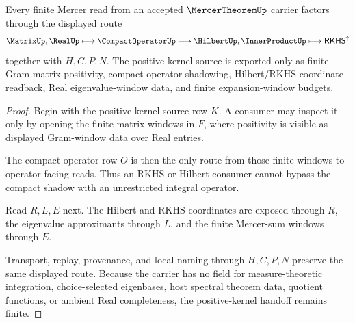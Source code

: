 \begin{theorem}
\label{thm:mercer-theorem-positive-kernel-handoff}
Every finite Mercer read from an accepted $\MercerTheoremUp$ carrier factors through the displayed route
$$
\MatrixUp,\RealUp \longmapsto \CompactOperatorUp \longmapsto \HilbertUp,\InnerProductUp \longmapsto \mathsf{RKHS}^{\uparrow}
$$
together with $H,C,P,N$. The positive-kernel source is exported only as finite Gram-matrix positivity, compact-operator shadowing, Hilbert/RKHS coordinate readback, Real eigenvalue-window data, and finite expansion-window budgets.
\end{theorem}
\begin{proof}
Begin with the positive-kernel source row $K$. A consumer may inspect it only by opening the finite matrix windows in $F$, where positivity is visible as displayed Gram-window data over Real entries.

The compact-operator row $O$ is then the only route from those finite windows to operator-facing reads. Thus an RKHS or Hilbert consumer cannot bypass the compact shadow with an unrestricted integral operator.

Read $R,L,E$ next. The Hilbert and RKHS coordinates are exposed through $R$, the eigenvalue approximants through $L$, and the finite Mercer-sum windows through $E$.

Transport, replay, provenance, and local naming through $H,C,P,N$ preserve the same displayed route. Because the carrier has no field for measure-theoretic integration, choice-selected eigenbases, host spectral theorem data, quotient functions, or ambient Real completeness, the positive-kernel handoff remains finite.
\end{proof}


\begin{closurestatus}{\MercerTheoremUp}
  \theoryclosure{\seedClosure}
  \formalstatus{\unformalizedV}
\end{closurestatus}
